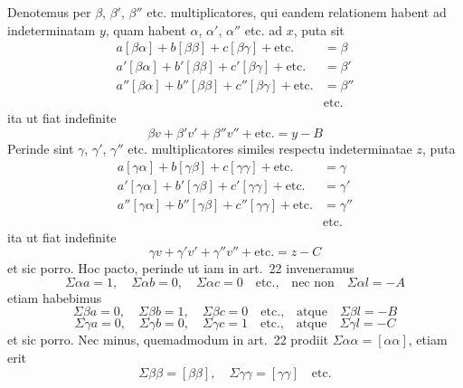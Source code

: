 \documentclass[12pt,a4paper]{book}
\begin{document}
Denotemus per $\beta$, $\beta'$, $\beta''$ etc. multiplicatores, qui eandem relationem habent ad indeterminatam $y$, quam habent $\alpha$, $\alpha'$, $\alpha''$ etc. ad $x$, puta sit
%
\begin{align*}
a[\beta\alpha]+b[\beta\beta]+c[\beta\gamma]+\text{etc.}&=\beta\\
a'[\beta\alpha]+b'[\beta\beta]+c'[\beta\gamma]+\text{etc.}&=\beta'\\
a''[\beta\alpha]+b''[\beta\beta]+c''[\beta\gamma]+\text{etc.}&=\beta''\\
&\text{etc.}
\end{align*}
ita ut fiat indefinite
%
\begin{equation*}
\beta v+\beta'v'+\beta''v''+\text{etc.}=y-B
\end{equation*}
Perinde sint $\gamma$, $\gamma'$, $\gamma''$ etc. multiplicatores similes respectu indeterminatae $z$, puta
%
\begin{align*}
a[\gamma\alpha]+b[\gamma\beta]+c[\gamma\gamma]+\text{etc.}&=\gamma\\
a'[\gamma\alpha]+b'[\gamma\beta]+c'[\gamma\gamma]+\text{etc.}&=\gamma'\\
a''[\gamma\alpha]+b''[\gamma\beta]+c''[\gamma\gamma]+\text{etc.}&=\gamma''\\
&\text{etc.}
\end{align*}
ita ut fiat indefinite
%
\begin{equation*}
\gamma v+\gamma'v'+\gamma''v''+\text{etc.}=z-C
\end{equation*}
et sic porro. Hoc pacto, perinde ut iam in art.~22 inveneramus
%
\begin{equation*}
\Sigma\alpha a=1,\quad \Sigma\alpha b=0,\quad \Sigma\alpha c=0\quad\text{etc.,}\quad\text{nec non}\quad \Sigma\alpha l=-A
\end{equation*}
etiam habebimus
%
\begin{equation*}
\Sigma\beta a=0,\quad \Sigma\beta b=1,\quad \Sigma\beta c=0\quad\text{etc.,}\quad\text{atque}\quad \Sigma\beta l=-B
\end{equation*}
%
\begin{equation*}
\Sigma\gamma a=0,\quad \Sigma\gamma b=0,\quad \Sigma\gamma c=1\quad\text{etc.,}\quad\text{atque}\quad \Sigma\gamma l=-C
\end{equation*}
et sic porro. Nec minus, quemadmodum in art.~22 prodiit $\Sigma\alpha\alpha=[\alpha\alpha]$, etiam erit
%
\begin{equation*}
\Sigma\beta\beta=[\beta\beta],\quad \Sigma\gamma\gamma=[\gamma\gamma]\quad\text{etc.}
\end{equation*}
\end{document}
